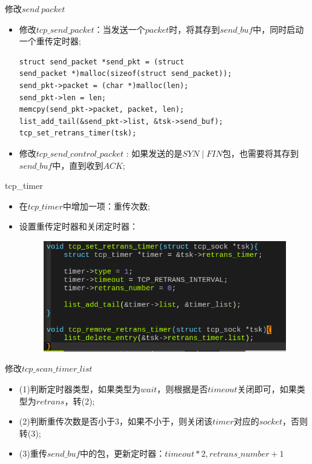 \documentclass{beamer}
\begin{document}
\begin{frame}[fragile]{修改$send\ packet$}
  \begin{itemize}
	\item 修改$tcp\_send\_packet$：当发送一个$packet$时，将其存到$send\_buf$中，同时启动一个重传定时器;
\begin{lstlisting}
struct send_packet *send_pkt = (struct 
send_packet *)malloc(sizeof(struct send_packet));
send_pkt->packet = (char *)malloc(len);
send_pkt->len = len;
memcpy(send_pkt->packet, packet, len);
list_add_tail(&send_pkt->list, &tsk->send_buf);
tcp_set_retrans_timer(tsk);
\end{lstlisting}
\item 修改$tcp\_send\_control\_packet$ : 如果发送的是$SYN\mid FIN$包，也需要将其存到$send\_buf$中，直到收到$ACK$;
  \end{itemize}
\end{frame}

\begin{frame}{tcp\_timer}
  \begin{itemize}
	\item 在$tcp\_timer$中增加一项：重传次数;
	  \item 设置重传定时器和关闭定时器：
		\begin{figure}[H]
		  \centering
		  \includegraphics[scale = 0.35]{./fig/try_timer.png}
		\end{figure}
  \end{itemize}
\end{frame}

\begin{frame}{修改$tcp\_scan\_timer\_list$}
  \begin{itemize}
	\item (1)判断定时器类型，如果类型为$wait$，则根据是否$timeout$关闭即可，如果类型为$retrans$，转(2);
	\item (2)判断重传次数是否小于$3$，如果不小于，则关闭该$timer$对应的$socket$，否则转(3);
	\item (3)重传$send\_buf$中的包，更新定时器：$timeout*2, retrans\_number + 1$
  \end{itemize}
\end{frame}
\end{document}
